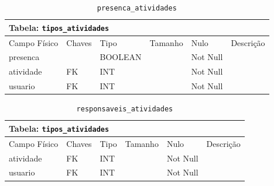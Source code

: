 \documentclass[12pt,a4paper]{article}
\begin{document}
\begin{center}
\begin{table}[h!]
	\caption{\texttt{presenca\_atividades}}
	\label{tabela:presencaAtividades}
	\begin{tabular}{|p{2.5cm}|p{1cm}|p{1.25cm}|p{1.75cm}|p{1.25cm}|p{5cm}|}\hline	
		\multicolumn{6}{|p{16cm}|}{\cellcolor{cinzaClaro}  \centering Tabela: \texttt{tipos\_atividades}} \\ \hline %
		{\small Campo Físico}   & {\small Chaves} & {\small Tipo} & {\small Tamanho} & {\small Nulo} & {\small Descrição}\\\hline %
		
		{\tiny presenca} & {\tiny } & {\tiny BOOLEAN} & {\tiny } & {\tiny Not Null} &{\tiny }\\\hline
		{\tiny atividade}  & {\tiny FK} & {\tiny INT} & {\tiny } & {\tiny Not Null} &{\tiny }\\\hline
		{\tiny usuario}  & {\tiny FK} & {\tiny INT} & {\tiny } & {\tiny Not Null} &{\tiny }\\\hline
			
	\end{tabular}
\end{table}	
\end{center}


\begin{center}
\begin{table}[h!]
	\caption{\texttt{responsaveis\_atividades}}
	\label{tabela:responsaveisAtividades}
	\begin{tabular}{|p{2.5cm}|p{1cm}|p{1.25cm}|p{1.75cm}|p{1.25cm}|p{5cm}|}\hline	
		\multicolumn{6}{|p{16cm}|}{\cellcolor{cinzaClaro}  \centering Tabela: \texttt{tipos\_atividades}} \\ \hline %
		{\small Campo Físico}   & {\small Chaves} & {\small Tipo} & {\small Tamanho} & {\small Nulo} & {\small Descrição}\\\hline %
		
		{\tiny atividade}  & {\tiny FK} & {\tiny INT} & {\tiny } & {\tiny Not Null} &{\tiny }\\\hline
		{\tiny usuario} & {\tiny FK} & {\tiny INT} & {\tiny } & {\tiny Not Null} &{\tiny }\\\hline
			
	\end{tabular}
\end{table}	
\end{center}
\end{document}
